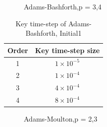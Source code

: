 \documentclass[a4paper,twocolumn]{article}
\theoremstyle{definition}
\begin{document}
\begin{figure}[!htp] 
	\centering
	\caption{Adams-Bashforth,p = 3,4 }
	\label{AB2ks}
\end{figure}
\begin{table}[!htp]
	\centering
	\begin{tabular}{|c|c|}
		\hline	
		Order & Key time-step size  \\
		\hline		
		1 & $1\times 10^{-5}$ \\	
		\hline		
		2 & $1\times 10^{-4}$   \\	
		\hline 
		3 & $4\times 10^{-4}$  \\
		\hline
		4 & $8\times 10^{-4}$  \\
		\hline
	\end{tabular}
	\caption{Key time-step of Adams-Bashforth, Initial1}
	\label{tab:test31}
\end{table}
\begin{figure}[!htp] 
	\centering
	\caption{Adams-Moulton,p = 2,3 }
	\label{AM1ks}
\end{figure}
\end{document}
